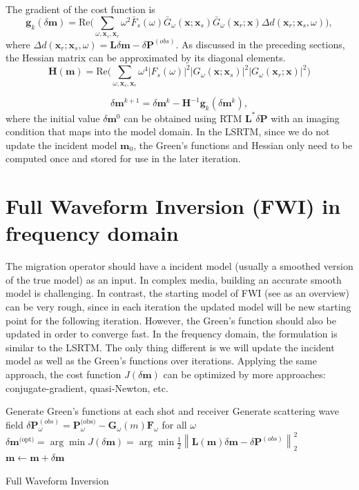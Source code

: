 \documentclass[11pt]{article}
\newcommand{\bx}{\boldsymbol{x}}
\newcommand{\bF}{\boldsymbol{F}}
\newcommand{\bG}{\boldsymbol{G}}
\newcommand{\bg}{\boldsymbol{g}}
\newcommand{\bH}{\boldsymbol{H}}
\newcommand{\bL}{\boldsymbol{L}}
\newcommand{\bm}{\boldsymbol{m}}
\newcommand{\bP}{\boldsymbol{P}}
\theoremstyle{plain}
\theoremstyle{definition}
\theoremstyle{remark}
\numberwithin{equation}{section}
\begin{document}
The gradient of the cost function is
\begin{equation}
\bg_k(\delta\bm)=\text{Re}\bigg(\sum_{\omega,\bx_s,\bx_r } \omega^2  \bar{F}_s(\omega) \bar{G}_\omega(\bx;\bx_s)\bar{ G}_\omega(\bx_r;\bx)\Delta d(\bx_r;\bx_s,\omega)\bigg), 
\end{equation}
where $\Delta d(\bx_r;\bx_s,\omega)=\bL\delta \bm - \delta\bP^{(obs)}$. 
As discussed in the preceding sections, the Hessian matrix can be approximated by its diagonal elements.
\begin{equation}
\bH(\bm)= \text{Re}\bigg( \sum_{\omega,\bx_s,\bx_r} \omega^4 |F_s(\omega)|^2 |G_\omega(\bx;\bx_s)|^2 |G_\omega(\bx_r;\bx)|^2 \bigg)
\end{equation} 

\begin{equation}
\delta \bm^{k+1}=\delta \bm^{k} - \bH^{-1} \bg_k(\delta \bm^k),
\end{equation}
where the initial value $\delta \bm^0$ can be obtained using RTM $\bL^* \delta \bP$ with an imaging condition that maps into the model domain.
In the LSRTM, since we do not update the incident model $\bm_0$, the Green's functions and Hessian only need to be computed once and stored
for use in the later iteration. 



\section{Full Waveform Inversion (FWI) in frequency domain}
The migration operator should have a incident model (usually a smoothed version of the true model) as an input. In complex media, building an accurate smooth model is challenging. In contrast, the starting model of FWI (see \cite{Virieux:2009aa} as an overview) can be very rough, since in each iteration the updated model will be new starting point for the following iteration. However, the Green's function should also be updated in order to converge fast. In the frequency domain, the formulation is similar to the LSRTM. The only thing different is we will update the incident model as well as the Green's functions over iterations. Applying the same approach, the cost function $J(\delta \bm)$ can be optimized by more approaches: conjugate-gradient, quasi-Newton, etc.

\begin{algorithm}[H]
\begin{algorithmic}[1]
\WHILE{$m(\bx)$ is not converged}
\STATE Generate Green's functions at each shot and receiver
\STATE Generate scattering wave field $\delta\bP^{(obs)}_{\omega}= \bP_{\omega}^{\text{(obs)}} - \bG_{\omega}(m)\bF_{\omega}$ for all $\omega$
\STATE $\delta \bm^{\text{(opt)}} = \arg\min J(\delta \bm) = \arg\min \frac{1}{2} \left\| \bL(\bm)\delta \bm - \delta\bP^{(obs)}\right\|_2^2$
\STATE $\bm \leftarrow \bm + \delta \bm$
\ENDWHILE
\end{algorithmic}
\caption{Full Waveform Inversion}
\end{algorithm}
\end{document}
